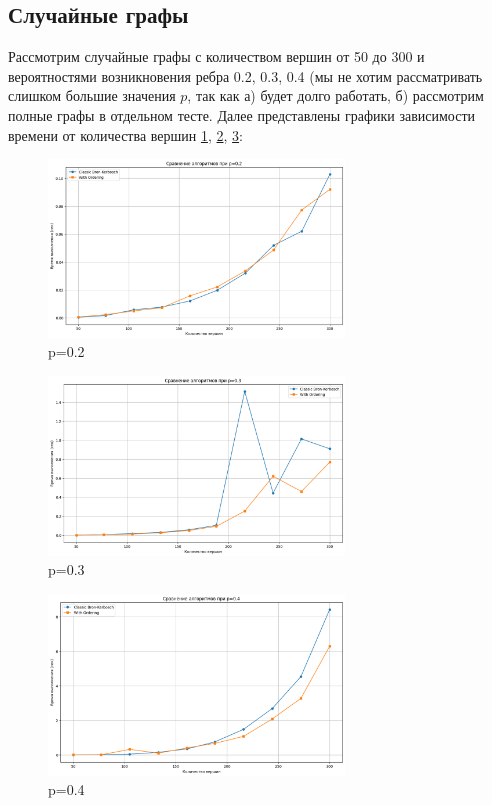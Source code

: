 \documentclass{article}
\begin{document}
\subsection{Случайные графы}
Рассмотрим случайные графы с количеством вершин от 50 до 300 и вероятностями возникновения ребра 0.2, 0.3, 0.4 (мы не хотим рассматривать слишком большие значения $p$, так как а) будет долго работать, б) рассмотрим полные графы в отдельном тесте.
Далее представлены графики зависимости времени от количества вершин \ref{fig:rand1}, \ref{fig:rand2}, \ref{fig:rand3}:

\begin{figure}[htbp] %
  \centering %
  \includegraphics[width=0.7\textwidth]{image/rand1.png}
  \caption{p=0.2} %
  \label{fig:rand1} %
\end{figure}

\begin{figure}[htbp]
  \centering
  \includegraphics[width=0.7\textwidth]{image/rand2.png}
  \caption{p=0.3}
  \label{fig:rand2}
\end{figure}

\begin{figure}[htbp]
  \centering
  \includegraphics[width=0.7\textwidth]{image/rand3.png}
  \caption{p=0.4}
  \label{fig:rand3}
\end{figure}
\end{document}
